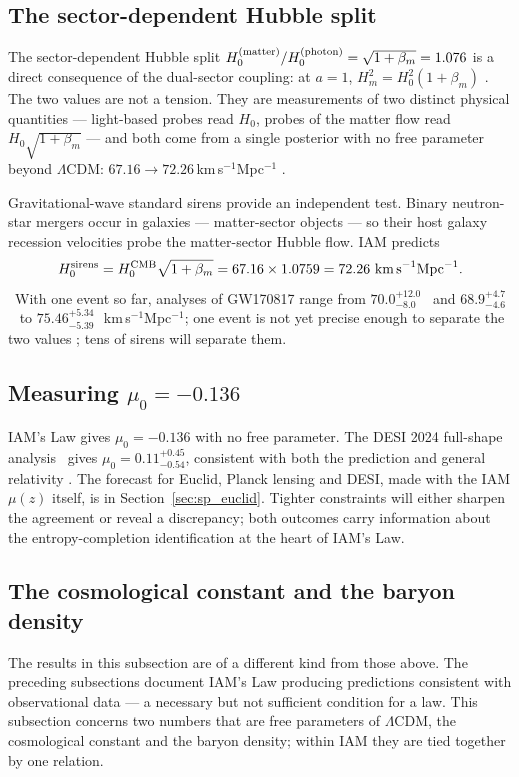 \subsection{The sector-dependent Hubble split}
The sector-dependent Hubble split $H_0^{(\rm matter)}/H_0^{(\rm photon)}=\sqrt{1+\beta_m}=1.076$ is a direct consequence of the dual-sector coupling: at $a=1$,
$H_m^2=H_0^2(1+\beta_m)$ \derived. The two values are not a tension. They are measurements of two distinct physical quantities --- light-based probes read
$H_0$, probes of the matter flow read $H_0\sqrt{1+\beta_m}$ --- and both come from a single posterior with no free parameter beyond $\Lambda$CDM:
$67.16\to72.26$\,km\,s$^{-1}$Mpc$^{-1}$ \calc.

Gravitational-wave standard sirens provide an independent test. Binary neutron-star mergers occur in galaxies --- matter-sector objects --- so their host
galaxy recession velocities probe the matter-sector Hubble flow. IAM predicts
\begin{equation}
H_0^{\rm sirens}=H_0^{\rm CMB}\sqrt{1+\beta_m}=67.16\times1.0759=72.26\ \text{km\,s}^{-1}\text{Mpc}^{-1}. \label{eq:law_sirens}
\end{equation}
\prediction\ With one event so far, analyses of GW170817 range from $70.0^{+12.0}_{-8.0}$~\cite{Abbott2017Siren} and $68.9^{+4.7}_{-4.6}$~\cite{Hotokezaka2019} to
$75.46^{+5.34}_{-5.39}$~\cite{Palmese2024}\,km\,s$^{-1}$Mpc$^{-1}$; one event is not yet precise enough to separate the two values \observed; tens of sirens will separate them.

\subsection{Measuring $\mu_0=-0.136$}
IAM's Law gives $\mu_0=-0.136$ with no free parameter. The DESI 2024 full-shape analysis~\cite{DESI2024VII} gives $\mu_0=0.11^{+0.45}_{-0.54}$, consistent
with both the prediction and general relativity \observed. The forecast for Euclid, Planck lensing and DESI, made with the IAM $\mu(z)$ itself, is in
Section~\ref{sec:sp_euclid}. Tighter constraints will either
sharpen the agreement or reveal a discrepancy; both outcomes carry information about the entropy-completion identification at the heart of IAM's Law.

\subsection{The cosmological constant and the baryon density}
The results in this subsection are of a different kind from those above. The preceding subsections document IAM's Law producing predictions consistent
with observational data --- a necessary but not sufficient condition for a law. This subsection concerns two numbers that are free parameters of
$\Lambda$CDM, the cosmological constant and the baryon density; within IAM they are tied together by one relation.

